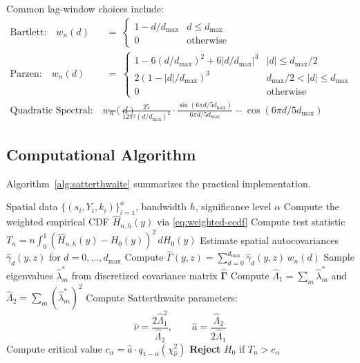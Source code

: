 Common lag-window choices include:
\begin{align}
\text{Bartlett:} \quad w_n(d) \;&=\; \begin{cases} 1 - d/d_{\max} & d \leq d_{\max} \\ 0 & \text{otherwise} \end{cases}\\[6pt]
\text{Parzen:} \quad w_n(d) \;&=\; \begin{cases} 1 - 6(d/d_{\max})^2 + 6|d/d_{\max}|^3 & |d| \leq d_{\max}/2 \\ 2(1 - |d|/d_{\max})^3 & d_{\max}/2 < |d| \leq d_{\max} \\ 0 & \text{otherwise} \end{cases}\\[6pt]
\text{Quadratic Spectral:} \quad w_n(d) \;&=\; \frac{25}{12\pi^2(d/d_{\max})^2} \cdot \frac{\sin(6\pi d/5d_{\max})}{6\pi d/5d_{\max}} - \cos(6\pi d/5d_{\max})
\end{align}


\subsection{Computational Algorithm}

Algorithm~\ref{alg:satterthwaite} summarizes the practical implementation.

\begin{algorithm}
\caption{Satterthwaite Calibration for Spatial CvM Test}
\label{alg:satterthwaite}
\begin{algorithmic}[1]
\Require Spatial data $\{(s_i, Y_i, k_i)\}_{i=1}^n$, bandwidth $h$, significance level $\alpha$
\State Compute the weighted empirical CDF $\widehat{H}_{n,h}(y)$ via \eqref{eq:weighted-ecdf}
\State Compute test statistic $T_n = n \int_0^1 (\widehat{H}_{n,h}(y) - H_0(y))^2 \, dH_0(y)$
\State Estimate spatial autocovariances $\widehat{\gamma}_d(y,z)$ for $d = 0, \ldots, d_{\max}$
\State Compute $\widehat{\Gamma}(y,z) = \sum_{d=0}^{d_{\max}} \widehat{\gamma}_d(y,z) \, w_n(d)$
\State Sample eigenvalues $\widehat{\lambda}_m^*$ from discretized covariance matrix $\mathbf{\widehat{\Gamma}}$
\State Compute $\widehat{\Lambda}_1 = \sum_m \widehat{\lambda}_m^*$ and $\widehat{\Lambda}_2 = \sum_m (\widehat{\lambda}_m^*)^2$
\State Compute Satterthwaite parameters:
\begin{equation*}
\widehat{\nu} = \frac{2\widehat{\Lambda}_1^2}{\widehat{\Lambda}_2}, \qquad
\widehat{a} = \frac{\widehat{\Lambda}_2}{2\widehat{\Lambda}_1}
\end{equation*}
\State Compute critical value $c_{\alpha} = \widehat{a} \cdot q_{1-\alpha}(\chi^2_{\widehat{\nu}})$
\State \textbf{Reject} $H_0$ if $T_n > c_{\alpha}$
\end{algorithmic}
\end{algorithm}


